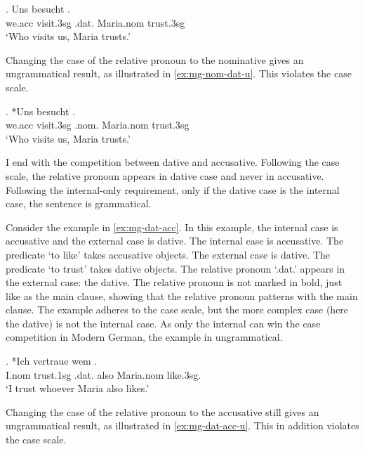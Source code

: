 \exg. Uns besucht   .\\
we.\ac{acc} visit.3\ac{sg}\scsub{[nom]} .\ac{dat}. Maria.\ac{nom} trust.3\ac{sg}\scsub{[dat]}\\
`Who visits us, Maria trusts.' \label{ex:mg-nom-dat}

Changing the case of the relative pronoun to the nominative gives an ungrammatical result, as illustrated in \ref{ex:mg-nom-dat-u}. This violates the case scale.

\exg. *Uns besucht   .\\
we.\ac{acc} visit.3\ac{sg}\scsub{[nom]} .\ac{nom}. Maria.\ac{nom} trust.3\ac{sg}\scsub{[dat]}\\
`Who visits us, Maria trusts.' \label{ex:mg-nom-dat-u}

I end with the competition between dative and accusative. Following the case scale, the relative pronoun appears in dative case and never in accusative. Following the internal-only requirement, only if the dative case is the internal case, the sentence is grammatical.

Consider the example in \ref{ex:mg-dat-acc}. In this example, the internal case is accusative and the external case is dative.
The internal case is accusative. The predicate  `to like' takes accusative objects.
The external case is dative. The predicate  `to trust' takes dative objects.
The relative pronoun  `.\ac{dat}.' appears in the external case: the dative. The relative pronoun is not marked in bold, just like as the main clause, showing that the relative pronoun patterns with the main clause.
The example adheres to the case scale, but the more complex case (here the dative) is not the internal case. As only the internal can win the case competition in Modern German, the example in ungrammatical.

\exg. *Ich vertraue wem   . \\
I.\ac{nom} trust.1\ac{sg}\scsub{[dat]} .\ac{dat}. also Maria.\ac{nom} like.3\ac{sg}\scsub{[acc]}.\\
`I trust whoever Maria also likes.' \label{ex:mg-dat-acc}

Changing the case of the relative pronoun to the accusative still gives an ungrammatical result, as illustrated in \ref{ex:mg-dat-acc-u}. This in addition violates the case scale.

